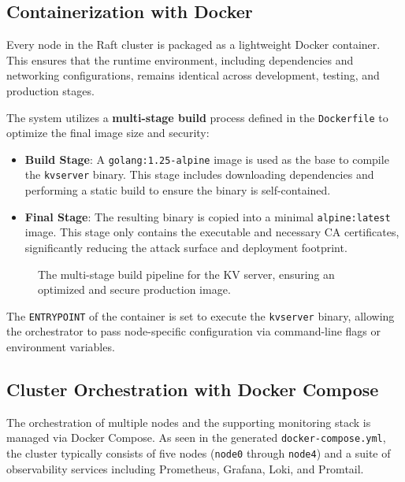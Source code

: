 \subsection{Containerization with Docker}
Every node in the Raft cluster is packaged as a lightweight Docker container. This ensures that the runtime environment, including dependencies and networking configurations, remains identical across development, testing, and production stages.

The system utilizes a \textbf{multi-stage build} process defined in the \texttt{Dockerfile} to optimize the final image size and security:
\begin{itemize}
    \item \textbf{Build Stage}: A \texttt{golang:1.25-alpine} image is used as the base to compile the \texttt{kvserver} binary. This stage includes downloading dependencies and performing a static build to ensure the binary is self-contained.
    \item \textbf{Final Stage}: The resulting binary is copied into a minimal \texttt{alpine:latest} image. This stage only contains the executable and necessary CA certificates, significantly reducing the attack surface and deployment footprint.
\end{itemize}

\begin{figure}[h]
    \centering
    \caption{The multi-stage build pipeline for the KV server, ensuring an optimized and secure production image.}
    \label{fig:docker_build}
\end{figure}

The \texttt{ENTRYPOINT} of the container is set to execute the \texttt{kvserver} binary, allowing the orchestrator to pass node-specific configuration via command-line flags or environment variables.

\subsection{Cluster Orchestration with Docker Compose}
The orchestration of multiple nodes and the supporting monitoring stack is managed via Docker Compose. As seen in the generated \texttt{docker-compose.yml}, the cluster typically consists of five nodes (\texttt{node0} through \texttt{node4}) and a suite of observability services including Prometheus, Grafana, Loki, and Promtail.

